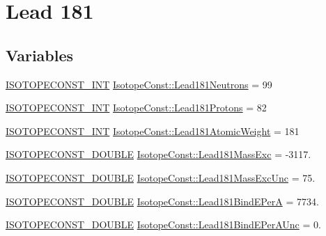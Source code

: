 \hypertarget{group___isotope_const-_lead-_pb181}{}\section{Lead 181}
\label{group___isotope_const-_lead-_pb181}
\subsection*{Variables}
\begin{DoxyCompactItemize}
\item 
\mbox{\hyperlink{group___isotope_const-_macros_ga5f18360b3e99483a35c32d789e62621c}{I\+S\+O\+T\+O\+P\+E\+C\+O\+N\+S\+T\+\_\+\+I\+NT}} \mbox{\hyperlink{group___isotope_const-_lead-_pb181_ga8049d37d374a1c780563d48e5c3369cc}{Isotope\+Const\+::\+Lead181\+Neutrons}} = 99
\item 
\mbox{\hyperlink{group___isotope_const-_macros_ga5f18360b3e99483a35c32d789e62621c}{I\+S\+O\+T\+O\+P\+E\+C\+O\+N\+S\+T\+\_\+\+I\+NT}} \mbox{\hyperlink{group___isotope_const-_lead-_pb181_ga0139342c5cb9e273b609b3f8aa5030d4}{Isotope\+Const\+::\+Lead181\+Protons}} = 82
\item 
\mbox{\hyperlink{group___isotope_const-_macros_ga5f18360b3e99483a35c32d789e62621c}{I\+S\+O\+T\+O\+P\+E\+C\+O\+N\+S\+T\+\_\+\+I\+NT}} \mbox{\hyperlink{group___isotope_const-_lead-_pb181_ga2b2a8f2af0e7cf3803239b5c376da559}{Isotope\+Const\+::\+Lead181\+Atomic\+Weight}} = 181
\item 
\mbox{\hyperlink{group___isotope_const-_macros_ga8f45a7272ce02c0b4c65c44636ed719a}{I\+S\+O\+T\+O\+P\+E\+C\+O\+N\+S\+T\+\_\+\+D\+O\+U\+B\+LE}} \mbox{\hyperlink{group___isotope_const-_lead-_pb181_ga90abe66ebbafeaa41bb48451f1cbe53d}{Isotope\+Const\+::\+Lead181\+Mass\+Exc}} = -\/3117.
\item 
\mbox{\hyperlink{group___isotope_const-_macros_ga8f45a7272ce02c0b4c65c44636ed719a}{I\+S\+O\+T\+O\+P\+E\+C\+O\+N\+S\+T\+\_\+\+D\+O\+U\+B\+LE}} \mbox{\hyperlink{group___isotope_const-_lead-_pb181_ga514d5802c3ce8b99c47f821f945ad3e3}{Isotope\+Const\+::\+Lead181\+Mass\+Exc\+Unc}} = 75.
\item 
\mbox{\hyperlink{group___isotope_const-_macros_ga8f45a7272ce02c0b4c65c44636ed719a}{I\+S\+O\+T\+O\+P\+E\+C\+O\+N\+S\+T\+\_\+\+D\+O\+U\+B\+LE}} \mbox{\hyperlink{group___isotope_const-_lead-_pb181_ga695bd89dc951a48fec94fc3551c45e21}{Isotope\+Const\+::\+Lead181\+Bind\+E\+PerA}} = 7734.
\item 
\mbox{\hyperlink{group___isotope_const-_macros_ga8f45a7272ce02c0b4c65c44636ed719a}{I\+S\+O\+T\+O\+P\+E\+C\+O\+N\+S\+T\+\_\+\+D\+O\+U\+B\+LE}} \mbox{\hyperlink{group___isotope_const-_lead-_pb181_ga9a1f77660161f6fecb8f384a7f87699c}{Isotope\+Const\+::\+Lead181\+Bind\+E\+Per\+A\+Unc}} = 0.

\end{DoxyCompactItemize}
